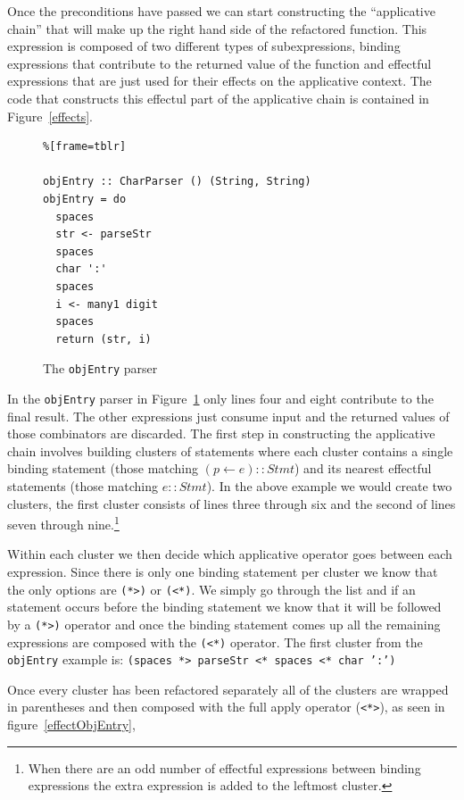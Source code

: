 Once the preconditions have passed we can start constructing the ``applicative chain'' that will make up the right hand side of the refactored function. This expression is composed of two different types of subexpressions, binding expressions that contribute to the returned value of the function and effectful expressions that are just used for their effects on the applicative context. The code that constructs this effectul part of the applicative chain is contained in Figure~\ref{effects}.

\begin{figure}[t]
\begin{lstlisting}%[frame=tblr]

objEntry :: CharParser () (String, String)
objEntry = do
  spaces
  str <- parseStr
  spaces
  char ':'
  spaces
  i <- many1 digit
  spaces
  return (str, i)
\end{lstlisting}
\caption{The \texttt{objEntry} parser}
\label{objEntry}
\end{figure}

In the \texttt{objEntry} parser in Figure~\ref{objEntry} only lines four and eight contribute to the final result. The other expressions just consume input and the returned values of those combinators are discarded. The first step in constructing the applicative chain involves building clusters of statements where each cluster contains a single binding statement (those matching $(p \leftarrow e) :: Stmt$) and its nearest effectful statements (those matching $e :: Stmt$). In the above example we would create two clusters, the first cluster consists of lines three through six and the second of lines seven through nine.\footnote{When there are an odd number of effectful expressions between binding expressions the extra expression is added to the leftmost cluster.}

Within each cluster we then decide which applicative operator goes between each expression. Since there is only one binding statement per cluster we know that the only options are \texttt{(*>)} or \texttt{(<*)}. We simply go through the list and if an statement occurs before the binding statement we know that it will be followed by a \texttt{(*>)} operator and once the binding statement comes up all the remaining expressions are composed with the \texttt{(<*)} operator. The first cluster from the \texttt{objEntry} example is: \texttt{(spaces *> parseStr <* spaces <* char ':')}

Once every cluster has been refactored separately all of the clusters are wrapped in parentheses and then composed with the full apply operator (\texttt{<*>}), as seen in figure~\ref{effectObjEntry},

